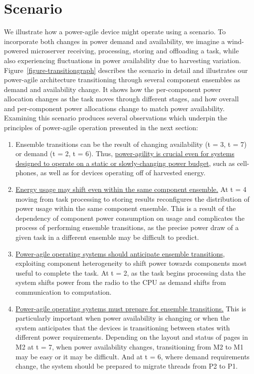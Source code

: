 \section{Scenario}
\label{section-scenario}



We illustrate how a power-agile device might operate using a scenario. To
incorporate both changes in power demand and availability, we imagine a
wind-powered microserver receiving, processing, storing and offloading a
task, while also experiencing fluctuations in power availability due to
harvesting variation. Figure~\ref{figure-transitiongraph} describes the
scenario in detail and illustrates our power-agile architecture transitioning
through several component ensembles as demand and availability change. It
shows how the per-component power allocation changes as the task moves
through different stages, and how overall and per-component power allocations
change to match power availability. Examining this scenario produces several
observations which underpin the principles of power-agile operation presented
in the next section:

\begin{enumerate}

\item Ensemble transitions can be the result of changing availability (t = 3,
t = 7) or demand (t = 2, t = 6). Thus, \uline{power-agility is crucial even
for systems designed to operate on a static or slowly-changing power budget},
such as cell-phones, as well as for devices operating off of harvested
energy.

\item \uline{Energy usage may shift even within the same component ensemble.}
At t = 4 moving from task processing to storing results reconfigures the
distribution of power usage within the same component ensemble. This is a
result of the dependency of component power consumption on usage and
complicates the process of performing ensemble transitions, as the precise
power draw of a given task in a different ensemble may be difficult to
predict.

\item \uline{Power-agile operating systems should anticipate ensemble
transitions}, exploiting component heterogeneity to shift power towards
components most useful to complete the task. At t = 2, as the task begins
processing data the system shifts power from the radio to the CPU as demand
shifts from communication to computation.

\item \uline{Power-agile operating systems must prepare for ensemble
transitions.} This is particularly important when power availability is
changing or when the system anticipates that the devices is transitioning
between states with different power requirements. Depending on the layout and
status of pages in M2 at t = 7, when power availability changes,
transitioning from M2 to M1 may be easy or it may be difficult. And at t = 6,
where demand requirements change, the system should be prepared to migrate
threads from P2 to P1.

\end{enumerate}
